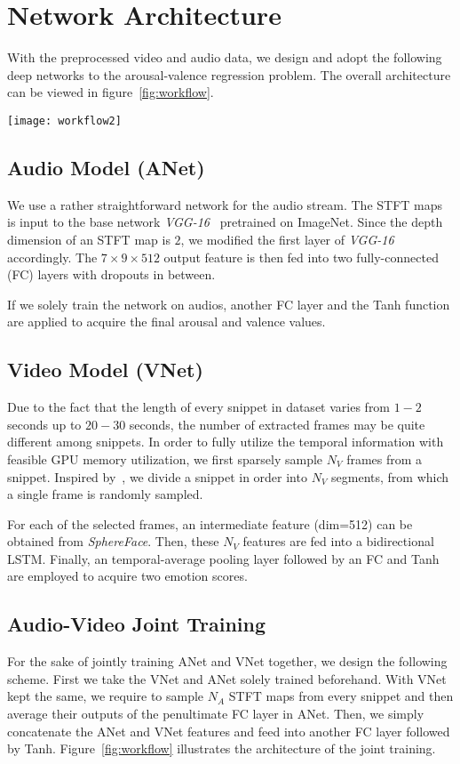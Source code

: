 \documentclass[a4paper, 10pt, conference]{ieeeconf}      %
\begin{document}
\section{Network Architecture}
\label{sec:net}
With the preprocessed video and audio data, we design and adopt the following deep networks to the arousal-valence regression problem.
The overall architecture can be viewed in figure~\ref{fig:workflow}.

\begin{figure*}
    \centering
    \texttt{[image: workflow2]}
    \caption{The workflow of the joint training architecture.}
    \label{fig:workflow}
\end{figure*}

\subsection{Audio Model (ANet)}
We use a rather straightforward network for the audio stream.
The STFT maps is input to the base network \emph{VGG-16}~\cite{vgg16} pretrained on ImageNet. Since the depth dimension of an STFT map is $2$, we modified the first layer of \emph{VGG-16} accordingly.
The $7\times 9\times 512$ output feature is then fed into two fully-connected (FC) layers with dropouts in between. 

If we solely train the network on audios, another FC layer and the Tanh function are applied to acquire the final arousal and valence values.

\subsection{Video Model (VNet)}
Due to the fact that the length of every snippet in dataset varies from $1-2$ seconds up to $20-30$ seconds, the number of extracted frames may be quite different among snippets.
In order to fully utilize the temporal information with feasible GPU memory utilization, we first sparsely sample $N_V$ frames from a snippet.
Inspired by~\cite{tsn2016eccv}, we divide a snippet in order into $N_V$ segments, from which a single frame is randomly sampled. 

For each of the selected frames, an intermediate feature (dim=512) can be obtained from \emph{SphereFace}. Then, these $N_V$ features are fed into a bidirectional LSTM. Finally, an temporal-average pooling layer followed by an FC and Tanh are employed to acquire two emotion scores.

\subsection{Audio-Video Joint Training}
For the sake of jointly training ANet and VNet together, we design the following scheme.
First we take the VNet and ANet solely trained beforehand.
With VNet kept the same, we require to sample $N_A$ STFT maps from every snippet and then average their outputs of the penultimate FC layer in ANet.
Then, we simply concatenate the ANet and VNet features and feed into another FC layer followed by Tanh.
Figure~\ref{fig:workflow} illustrates the architecture of the joint training.
\end{document}
